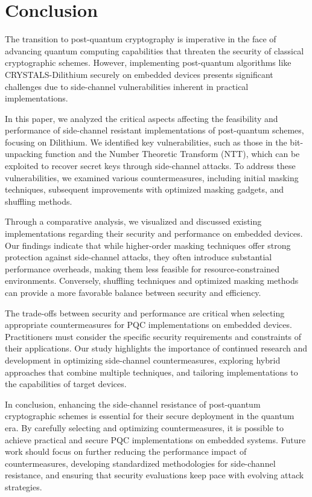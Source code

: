 \chapter{Conclusion}
\thispagestyle{chapterstart}

The transition to post-quantum cryptography is imperative in the face of advancing quantum computing capabilities that threaten the security of classical cryptographic schemes. However, implementing post-quantum algorithms like CRYSTALS-Dilithium securely on embedded devices presents significant challenges due to side-channel vulnerabilities inherent in practical implementations.

In this paper, we analyzed the critical aspects affecting the feasibility and performance of side-channel resistant implementations of post-quantum schemes, focusing on Dilithium. We identified key vulnerabilities, such as those in the bit-unpacking function and the Number Theoretic Transform (NTT), which can be exploited to recover secret keys through side-channel attacks. To address these vulnerabilities, we examined various countermeasures, including initial masking techniques, subsequent improvements with optimized masking gadgets, and shuffling methods.

Through a comparative analysis, we visualized and discussed existing implementations regarding their security and performance on embedded devices. Our findings indicate that while higher-order masking techniques offer strong protection against side-channel attacks, they often introduce substantial performance overheads, making them less feasible for resource-constrained environments. Conversely, shuffling techniques and optimized masking methods can provide a more favorable balance between security and efficiency.

The trade-offs between security and performance are critical when selecting appropriate countermeasures for PQC implementations on embedded devices. Practitioners must consider the specific security requirements and constraints of their applications. Our study highlights the importance of continued research and development in optimizing side-channel countermeasures, exploring hybrid approaches that combine multiple techniques, and tailoring implementations to the capabilities of target devices.

In conclusion, enhancing the side-channel resistance of post-quantum cryptographic schemes is essential for their secure deployment in the quantum era. By carefully selecting and optimizing countermeasures, it is possible to achieve practical and secure PQC implementations on embedded systems. Future work should focus on further reducing the performance impact of countermeasures, developing standardized methodologies for side-channel resistance, and ensuring that security evaluations keep pace with evolving attack strategies.
